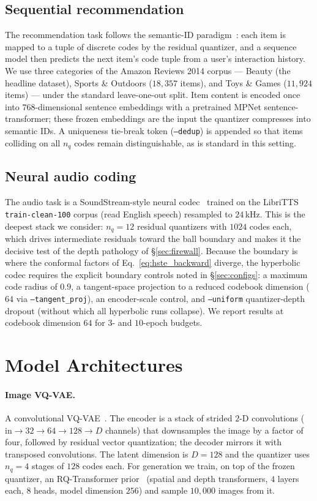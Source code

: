 \documentclass[12pt]{report}
\begin{document}
\subsection{Sequential recommendation}
\label{sec:tasks_rec}
The recommendation task follows the semantic-ID paradigm~\cite{tiger}: each item is mapped to a tuple of discrete codes by the residual quantizer, and a sequence model then predicts the next item's code tuple from a user's interaction history. We use three categories of the Amazon Reviews 2014 corpus --- Beauty (the headline dataset), Sports \& Outdoors ($18{,}357$ items), and Toys \& Games ($11{,}924$ items) --- under the standard leave-one-out split. Item content is encoded once into $768$-dimensional sentence embeddings with a pretrained MPNet sentence-transformer; these frozen embeddings are the input the quantizer compresses into semantic IDs. A uniqueness tie-break token (\texttt{--dedup}) is appended so that items colliding on all $n_q$ codes remain distinguishable, as is standard in this setting.

\subsection{Neural audio coding}
\label{sec:tasks_audio}
The audio task is a SoundStream-style neural codec~\cite{soundstream,encodec} trained on the LibriTTS \texttt{train-clean-100} corpus (read English speech) resampled to $24$\,kHz. This is the deepest stack we consider: $n_q=12$ residual quantizers with $1024$ codes each, which drives intermediate residuals toward the ball boundary and makes it the decisive test of the depth pathology of \S\ref{sec:firewall}. Because the boundary is where the conformal factors of Eq.~\ref{eq:hste_backward} diverge, the hyperbolic codec requires the explicit boundary controls noted in \S\ref{sec:configs}: a maximum code radius of $0.9$, a tangent-space projection to a reduced codebook dimension ($64$ via \texttt{--tangent\_proj}), an encoder-scale control, and \texttt{--uniform} quantizer-depth dropout (without which all hyperbolic runs collapse). We report results at codebook dimension $64$ for $3$- and $10$-epoch budgets.

\section{Model Architectures}
\label{sec:models}

\paragraph{Image VQ-VAE.} A convolutional VQ-VAE~\cite{vqvae}. The encoder is a stack of strided $2$-D convolutions ($\text{in}\to32\to64\to128\to D$ channels) that downsamples the image by a factor of four, followed by residual vector quantization; the decoder mirrors it with transposed convolutions. The latent dimension is $D=128$ and the quantizer uses $n_q=4$ stages of $128$ codes each. For generation we train, on top of the frozen quantizer, an RQ-Transformer prior~\cite{lee2022rqvae} (spatial and depth transformers, $4$ layers each, $8$ heads, model dimension $256$) and sample $10{,}000$ images from it.
\end{document}
